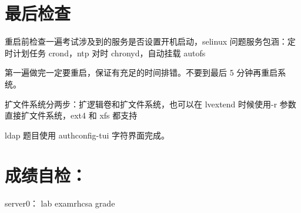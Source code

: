 \documentclass[letterpaper,10pt,english]{sphinxmanual}
\begin{document}
\section{最后检查}
\label{\detokenize{rhcsa/rhcsa_7:id13}}
重启前检查一遍考试涉及到的服务是否设置开机启动，selinux 问题服务包涵：定时计划任务 crond，ntp 对时 chronyd，自动挂载 autofs

第一遍做完一定要重启，保证有充足的时间排错。不要到最后 5 分钟再重启系统。

扩文件系统分两步：扩逻辑卷和扩文件系统，也可以在 lvextend 时候使用-r 参数直接扩文件系统，ext4 和 xfs 都支持

ldap 题目使用 authconfig-tui 字符界面完成。


\section{成绩自检：}
\label{\detokenize{rhcsa/rhcsa_7:id14}}
server0： lab examrhcsa grade



\renewcommand{\indexname}{Index}
\printindex
\end{document}
